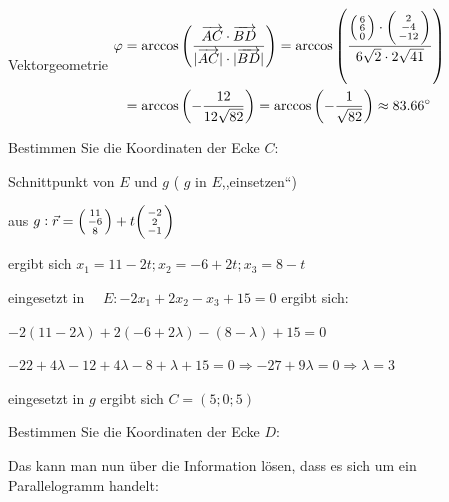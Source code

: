 \begin{example2}[breakable]{Vektorgeometrie}
    $
    \begin{aligned}
    \varphi & =\arccos \left(\frac{\overrightarrow{A C} \cdot \overrightarrow{B D}}{|\overrightarrow{A C}| \cdot|\overrightarrow{B D}|}\right)=\arccos \left(\frac{\begin{psmallmatrix}6 \\ 6 \\ 0\end{psmallmatrix} \cdot\begin{psmallmatrix}2 \\ -4 \\ -12\end{psmallmatrix}}{6 \sqrt{2} \cdot 2 \sqrt{41}}\right)\\ 
    & =\arccos \left(-\frac{12}{12 \sqrt{82}}\right) =\arccos \left(-\frac{1}{\sqrt{82}}\right) \approx 83.66^{\circ}
    \end{aligned}
    $

    \vspace{3mm}

    Bestimmen Sie die Koordinaten der Ecke $C$:

    Schnittpunkt von $E$ und $g$ ( $g$ in $E$,,einsetzen“)

    aus $g: \vec{r}=\begin{psmallmatrix}11 \\ -6 \\ 8\end{psmallmatrix}+t\begin{psmallmatrix}-2 \\ 2 \\ -1\end{psmallmatrix}$ 
    
    ergibt sich $x_{1}=11-2 t ; x_{2}=-6+2 t ; x_{3}=8-t$

    eingesetzt in $\quad E:-2 x_{1}+2 x_{2}-x_{3}+15=0$
    ergibt sich: 
    
    $-2(11-2 \lambda)+2(-6+2 \lambda)-(8-\lambda)+15=0$

    $
    -22+4 \lambda-12+4 \lambda-8+\lambda+15=0
    \Rightarrow
    -27+9 \lambda=0 \Rightarrow \lambda=3
    $

    eingesetzt in $g$ ergibt sich $C=(5 ; 0 ; 5)$

    \vspace{6mm}

    Bestimmen Sie die Koordinaten der Ecke $D$:

    Das kann man nun über die Information lösen, dass es sich um ein Parallelogramm handelt:


\end{example2}
